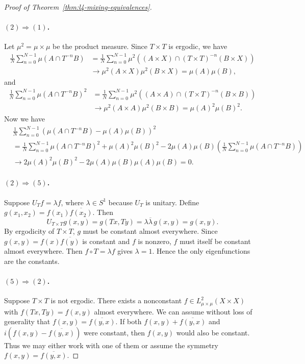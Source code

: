 \documentclass[11pt,a4paper]{article}
\begin{document}
\begin{proof}[Proof of Theorem~\ref{thm:l4-mixing-equivalences}]
\paragraph{$(2)\Longrightarrow(1)$.}
Let $\mu^2=\mu\times\mu$ be the product measure. Since $T\times T$ is
ergodic, we have
\[
 \begin{aligned}
 \frac1N\sum_{n=0}^{N-1}\mu(A\cap T^{-n}B)
 &=\frac1N\sum_{n=0}^{N-1}\mu^2((A\times X)\cap(T\times T)^{-n}(B\times X))\\
 &\longrightarrow\mu^2(A\times X)\mu^2(B\times X)=\mu(A)\mu(B),
 \end{aligned}
\]
and
\[
 \begin{aligned}
 \frac1N\sum_{n=0}^{N-1}\mu(A\cap T^{-n}B)^2
 &=\frac1N\sum_{n=0}^{N-1}\mu^2((A\times A)\cap(T\times T)^{-n}(B\times B))\\
 &\longrightarrow\mu^2(A\times A)\mu^2(B\times B)=\mu(A)^2\mu(B)^2.
 \end{aligned}
\]
Now we have
\[
 \begin{aligned}
 &\frac1N\sum_{n=0}^{N-1}(\mu(A\cap T^{-n}B)-\mu(A)\mu(B))^2\\
 &=\frac1N\sum_{n=0}^{N-1}\mu(A\cap T^{-n}B)^2+\mu(A)^2\mu(B)^2
 -2\mu(A)\mu(B)\left(\frac1N\sum_{n=0}^{N-1}\mu(A\cap T^{-n}B)\right)\\
 &\longrightarrow2\mu(A)^2\mu(B)^2-2\mu(A)\mu(B)\mu(A)\mu(B)=0.
 \end{aligned}
\]

\paragraph{$(2)\Longrightarrow(5)$.}
Suppose $U_Tf=\lambda f$, where $\lambda\in S^1$ because $U_T$ is
unitary. Define $g(x_1,x_2)=f(x_1)\overline{f(x_2)}$. Then
\[
 U_{T\times T}g(x,y)=g(Tx,Ty)=\lambda\overline\lambda\,g(x,y)=g(x,y).
\]
By ergodicity of $T\times T$, $g$ must be constant almost everywhere.
Since $g(x,y)=f(x)\overline{f(y)}$ is constant and $f$ is nonzero, $f$ must itself be constant almost everywhere. Then $f\circ T=\lambda f$ gives $\lambda=1$. Hence the only eigenfunctions are the constants.


\paragraph{$(5)\Longrightarrow(2)$.}
Suppose $T\times T$ is not ergodic. There exists a nonconstant
$f\in L^2_{\mu\times\mu}(X\times X)$ with $f(Tx,Ty)=f(x,y)$ almost
everywhere. We can assume without loss of generality that
$f(x,y)=\overline{f(y,x)}$. If both
$f(x,y)+\overline{f(y,x)}$ and
$i(f(x,y)-\overline{f(y,x)})$ were constant, then $f(x,y)$ would also be
constant. Thus we may either work with one of them or assume the symmetry
$f(x,y)=\overline{f(y,x)}$.


\end{proof}
\end{document}
